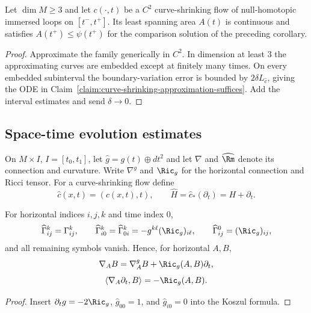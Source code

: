 \begin{lemma}
\label{lem:immersed-curve-shrinking-area-bound}
\label{nonembeasycase}
Let $\dim M\ge3$ and let $c(\cdot,t)$ be a $C^2$ curve-shrinking flow of
null-homotopic immersed loops on $[t^-,t^+]$. Its least spanning area $A(t)$
is continuous and satisfies $A(t^+)\le\psi(t^+)$ for the comparison solution
of the preceding corollary.
\end{lemma}
\begin{proof}
\sketch Approximate the family generically in $C^2$. In dimension at least $3$ the
approximating curves are embedded except at finitely many times. On every
embedded subinterval the boundary-variation error is bounded by
$2\delta L_{\hat c}$, giving the ODE in
Claim~\ref{claim:curve-shrinking-approximation-suffices}. Add the interval
estimates and send $\delta\to0$.
\end{proof}

\subsection{Space-time evolution estimates}

\begin{notation}
\label{not:curve-shrinking-spacetime}
\label{spacetimehat}
On $M\times I$, $I=[t_0,t_1]$, let $\hat g=g(t)\oplus dt^2$ and let $\nabla$
and $\widehat{\Rm}$ denote its connection and curvature. Write $\nabla^g$ and
$\Ric_g$ for the horizontal connection and Ricci tensor. For a
curve-shrinking flow define
\[
\hat c(x,t)=(c(x,t),t),\qquad \widehat H=\hat c_*(\partial_t)=H+\partial_t.
\]
\end{notation}

\begin{lemma}
\label{lem:spacetime-christoffel}
\label{hatchristoffel}
For horizontal indices $i,j,k$ and time index $0$,
\[
\widehat\Gamma^k_{ij}=\Gamma^k_{ij},\qquad
\widehat\Gamma^k_{i0}=\widehat\Gamma^k_{0i}=-g^{k\ell}(\Ric_g)_{i\ell},
\qquad \widehat\Gamma^0_{ij}=(\Ric_g)_{ij},
\]
and all remaining symbols vanish. Hence, for horizontal $A,B$,
\begin{equation}\label{hatEq1}
\nabla_AB=\nabla^g_AB+\Ric_g(A,B)\partial_t,
\end{equation}
\begin{equation}\label{hatEq2}
\langle\nabla_A\partial_t,B\rangle=-\Ric_g(A,B).
\end{equation}
\end{lemma}
\begin{proof}
\sketch Insert $\partial_tg=-2\Ric_g$, $\hat g_{00}=1$, and $\hat g_{i0}=0$ into the
Koszul formula.
\end{proof}

